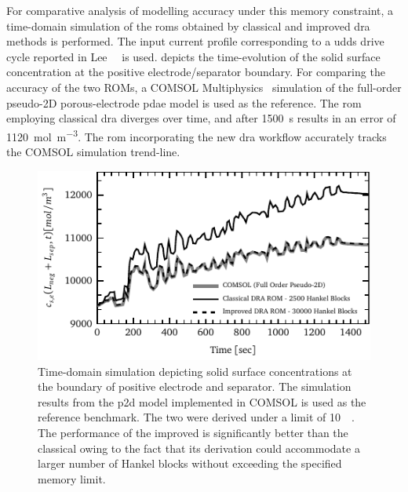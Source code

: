For comparative analysis  of modelling accuracy under this  memory constraint, a
time-domain simulation  of the  \glspl{rom} obtained  by classical  and improved
\gls{dra}  methods is  performed.  The input  current  profile corresponding  to
a  \gls{udds}  drive  cycle  reported in  Lee~\etal{}~\cite{Lee2012a}  is  used.
  depicts  the  time-evolution of  the  solid  surface
concentration  at  the  positive  electrode/separator  boundary.  For  comparing
the  accuracy   of  the   two  ROMs,  a   COMSOL  Multiphysics~\cite{COMSOL2012}
simulation  of  the  full-order   pseudo-2D  porous-electrode  \gls{pdae}  model
is  used  as   the  reference.  The  \gls{rom}   employing  classical  \gls{dra}
diverges  over   time,  and  after   \SI{1500}{\second}  results  in   an  error
of  \SI{1120}{\mole\per\meter\cubed}.   The  \gls{rom}  incorporating   the  new
\gls{dra}  workflow   accurately  tracks   the  COMSOL   simulation  trend-line.

\begin{figure}[!htbp]
    \centering
    \includegraphics{comsol_comparison.pdf}
    \caption[%
    Evolution of solid surface concentrations at
    positive electrode/separator interface.
    ]%
    {%
        Time-domain  simulation depicting  solid surface  concentrations at  the
        boundary  of positive  electrode and  separator. The  simulation results
        from  the  \gls{p2d}  model  implemented   in  COMSOL  is  used  as  the
        reference  benchmark. The  two    were derived  under
        a    limit   of  \SI{10}{\giga\byte}.  The  performance
        of  the  improved   is  significantly  better than  the
        classical  owing to the  fact that its derivation could
        accommodate  a larger  number  of Hankel  blocks  without exceeding  the
        specified memory limit.
    }%
    \label{fig:time_domain_sim}
\end{figure}

